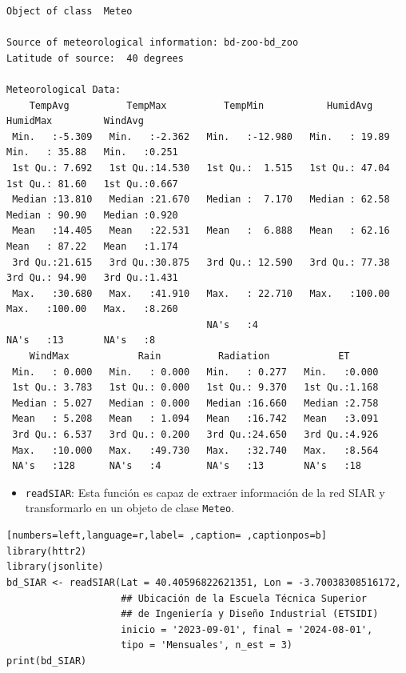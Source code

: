\begin{verbatim}
Object of class  Meteo 

Source of meteorological information: bd-zoo-bd_zoo 
Latitude of source:  40 degrees

Meteorological Data:
    TempAvg          TempMax          TempMin           HumidAvg         HumidMax         WindAvg     
 Min.   :-5.309   Min.   :-2.362   Min.   :-12.980   Min.   : 19.89   Min.   : 35.88   Min.   :0.251  
 1st Qu.: 7.692   1st Qu.:14.530   1st Qu.:  1.515   1st Qu.: 47.04   1st Qu.: 81.60   1st Qu.:0.667  
 Median :13.810   Median :21.670   Median :  7.170   Median : 62.58   Median : 90.90   Median :0.920  
 Mean   :14.405   Mean   :22.531   Mean   :  6.888   Mean   : 62.16   Mean   : 87.22   Mean   :1.174  
 3rd Qu.:21.615   3rd Qu.:30.875   3rd Qu.: 12.590   3rd Qu.: 77.38   3rd Qu.: 94.90   3rd Qu.:1.431  
 Max.   :30.680   Max.   :41.910   Max.   : 22.710   Max.   :100.00   Max.   :100.00   Max.   :8.260  
                                   NA's   :4                          NA's   :13       NA's   :8      
    WindMax            Rain          Radiation            ET       
 Min.   : 0.000   Min.   : 0.000   Min.   : 0.277   Min.   :0.000  
 1st Qu.: 3.783   1st Qu.: 0.000   1st Qu.: 9.370   1st Qu.:1.168  
 Median : 5.027   Median : 0.000   Median :16.660   Median :2.758  
 Mean   : 5.208   Mean   : 1.094   Mean   :16.742   Mean   :3.091  
 3rd Qu.: 6.537   3rd Qu.: 0.200   3rd Qu.:24.650   3rd Qu.:4.926  
 Max.   :10.000   Max.   :49.730   Max.   :32.740   Max.   :8.564  
 NA's   :128      NA's   :4        NA's   :13       NA's   :18
\end{verbatim}

\begin{itemize}
\item \texttt{readSIAR}: Esta función es capaz de extraer información de la red SIAR y transformarlo en un objeto de clase \texttt{Meteo}.
\end{itemize}
\begin{lstlisting}[numbers=left,language=r,label= ,caption= ,captionpos=b]
library(httr2)
library(jsonlite)
bd_SIAR <- readSIAR(Lat = 40.40596822621351, Lon = -3.70038308516172,
                    ## Ubicación de la Escuela Técnica Superior
                    ## de Ingeniería y Diseño Industrial (ETSIDI)
                    inicio = '2023-09-01', final = '2024-08-01',
                    tipo = 'Mensuales', n_est = 3)
print(bd_SIAR)
\end{lstlisting}

